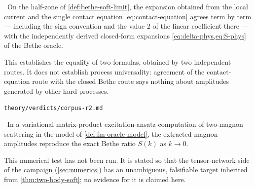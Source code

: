 \begin{proposition}
\label{thm:oracle-consistency}
\statusProved\ On the half-zone of \cref{def:bethe-soft-limit}, the expansion
obtained from the local current and the single contact equation
\cref{eq:contact-equation} agrees term by term --- including the sign
convention and the value $2$ of the linear coefficient there --- with the
independently derived closed-form expansions \cref{eq:delta-phys,eq:S-phys} of
the Bethe oracle.
\end{proposition}
\begin{scope}
This establishes the equality of two formulas, obtained by two independent
routes. It does not establish process universality: agreement of the
contact-equation route with the closed Bethe route says nothing about
amplitudes generated by other hard processes.
\end{scope}
%
{\texttt{theory/verdicts/corpus-r2.md}}

\begin{conjecture}
\label{conj:excitation-ansatz-bethe}
\statusConjecture\ In a variational matrix-product excitation-ansatz
computation of two-magnon scattering in the model of
\cref{def:fm-oracle-model}, the extracted magnon amplitudes reproduce the
exact Bethe ratio $S(k)$ as $k\to0$.
\end{conjecture}
\begin{scope}
This numerical test has not been run. It is stated so that the tensor-network
side of the campaign (\cref{sec:numerics}) has an unambiguous, falsifiable
target inherited from \cref{thm:two-body-soft}; no evidence for it is claimed
here.
\end{scope}
